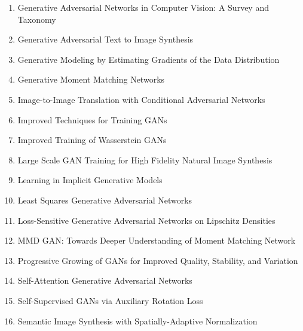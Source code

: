 \documentclass[acmlarge]{acmart}
\begin{document}
\begin{enumerate}
	\item Generative Adversarial Networks in Computer Vision: A Survey and Taxonomy \cite{wang2019generative} 

	\item Generative Adversarial Text to Image Synthesis \cite{reed2016generative} 

	\item Generative Modeling by Estimating Gradients of the Data Distribution \cite{song2019generative} 

	\item Generative Moment Matching Networks \cite{li2015generative} 

	\item Image-to-Image Translation with Conditional Adversarial Networks \cite{isola2016imagetoimage} 

	\item Improved Techniques for Training GANs \cite{salimans2016improved} 

	\item Improved Training of Wasserstein GANs \cite{gulrajani2017improved} 

	\item Large Scale GAN Training for High Fidelity Natural Image Synthesis \cite{brock2018large} 

	\item Learning in Implicit Generative Models \cite{mohamed2016learning} 

	\item Least Squares Generative Adversarial Networks \cite{mao2016squares} 

	\item Loss-Sensitive Generative Adversarial Networks on Lipschitz Densities \cite{qi2017losssensitive} 

	\item MMD GAN: Towards Deeper Understanding of Moment Matching Network \cite{li2017mmd} 

	\item Progressive Growing of GANs for Improved Quality, Stability, and Variation \cite{karras2017progressive} 

	\item Self-Attention Generative Adversarial Networks \cite{zhang2018selfattention} 

	\item Self-Supervised GANs via Auxiliary Rotation Loss \cite{chen2018selfsupervised} 

	\item Semantic Image Synthesis with Spatially-Adaptive Normalization \cite{park2019semantic} 


\end{enumerate}
\end{document}
